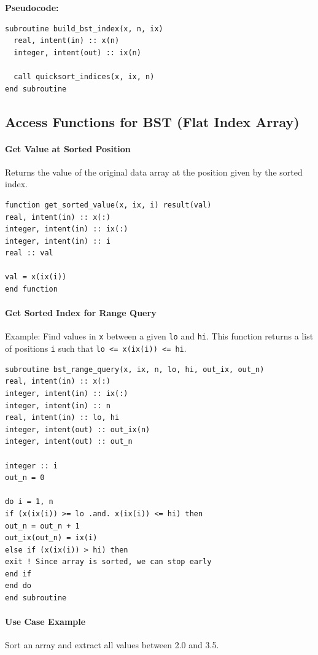 \documentclass{article}
\begin{document}
\textbf{Pseudocode:}
\begin{verbatim}
subroutine build_bst_index(x, n, ix)
  real, intent(in) :: x(n)
  integer, intent(out) :: ix(n)

  call quicksort_indices(x, ix, n)
end subroutine
\end{verbatim}

\subsection{Access Functions for BST (Flat Index Array)}

\paragraph{Get Value at Sorted Position}
Returns the value of the original data array at the position given by the sorted index.

\begin{verbatim}
function get_sorted_value(x, ix, i) result(val)
real, intent(in) :: x(:)
integer, intent(in) :: ix(:)
integer, intent(in) :: i
real :: val

val = x(ix(i))
end function
\end{verbatim}

\paragraph{Get Sorted Index for Range Query}
Example: Find values in \texttt{x} between a given \texttt{lo} and \texttt{hi}. This function returns a list of positions \texttt{i} such that \texttt{lo <= x(ix(i)) <= hi}.

\begin{verbatim}
subroutine bst_range_query(x, ix, n, lo, hi, out_ix, out_n)
real, intent(in) :: x(:)
integer, intent(in) :: ix(:)
integer, intent(in) :: n
real, intent(in) :: lo, hi
integer, intent(out) :: out_ix(n)
integer, intent(out) :: out_n

integer :: i
out_n = 0

do i = 1, n
if (x(ix(i)) >= lo .and. x(ix(i)) <= hi) then
out_n = out_n + 1
out_ix(out_n) = ix(i)
else if (x(ix(i)) > hi) then
exit ! Since array is sorted, we can stop early
end if
end do
end subroutine
\end{verbatim}

\paragraph{Use Case Example}
Sort an array and extract all values between 2.0 and 3.5.
\end{document}

